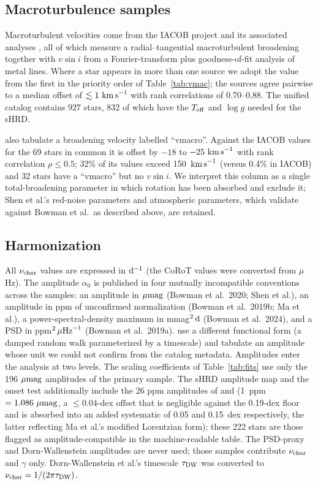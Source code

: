 \documentclass[twocolumn]{aastex631}
\newcommand{\vsini}{v\sin i}
\newcommand{\teff}{T_{\rm eff}}
\newcommand{\nuchar}{\nu_{\rm char}}
\newcommand{\umag}{\mu{\rm mag}}
\newcommand{\dinv}{{\rm d}^{-1}}
\newcommand{\kms}{{\rm km\,s}^{-1}}
\begin{document}
\subsection{Macroturbulence samples}\label{sec:vmac}

Macroturbulent velocities come from the IACOB project and its associated analyses \citep{simondiaz2014,simondiaz2017,holgado2018,deburgos2023,deburgos2024,burssens2020}, all of which measure a radial--tangential macroturbulent broadening together with $\vsini$ from a Fourier-transform plus goodness-of-fit analysis of metal lines. Where a star appears in more than one source we adopt the value from the first in the priority order of Table~\ref{tab:vmac}; the sources agree pairwise to a median offset of $\lesssim1~\kms$ with rank correlations of 0.70--0.88. The unified catalog contains 927 stars, 832 of which have the $\teff$ and $\log g$ needed for the sHRD.

\citet{shen2024} also tabulate a broadening velocity labelled ``vmacro''. Against the IACOB values for the 69 stars in common it is offset by $-18$ to $-25~\kms$ with rank correlation $\rho\le0.5$; 32\% of its values exceed 150~$\kms$ (versus 0.4\% in IACOB) and 32 stars have a ``vmacro'' but no $\vsini$. We interpret this column as a single total-broadening parameter in which rotation has been absorbed and exclude it; Shen et al.'s red-noise parameters and atmospheric parameters, which validate against Bowman et al.\ as described above, are retained.

\subsection{Harmonization}\label{sec:harmon}

All $\nuchar$ values are expressed in $\dinv$ (the CoRoT values were converted from $\mu$Hz). The amplitude $\alpha_0$ is published in four mutually incompatible conventions across the samples: an amplitude in $\umag$ (Bowman et al.\ 2020; Shen et al.), an amplitude in ppm of unconfirmed normalization (Bowman et al.\ 2019b; Ma et al.), a power-spectral-density maximum in mmag$^2\,{\rm d}$ (Bowman et al.\ 2024), and a PSD in ppm$^2\,\mu{\rm Hz}^{-1}$ (Bowman et al.\ 2019a). \citet{dornwallenstein2020} use a different functional form (a damped random walk parameterized by a timescale) and tabulate an amplitude whose unit we could not confirm from the catalog metadata. Amplitudes enter the analysis at two levels. The scaling coefficients of Table~\ref{tab:fits} use only the 196 $\umag$ amplitudes of the primary sample. The sHRD amplitude map and the onset test additionally include the 26 ppm amplitudes of \citet{bowman2019b} and \citet{ma2024} (1~ppm $=1.086~\umag$, a $\le0.04$-dex offset that is negligible against the 0.19-dex floor and is absorbed into an added systematic of 0.05 and 0.15~dex respectively, the latter reflecting Ma et al.'s modified Lorentzian form); these 222 stars are those flagged as amplitude-compatible in the machine-readable table. The PSD-proxy and Dorn-Wallenstein amplitudes are never used; those samples contribute $\nuchar$ and $\gamma$ only. Dorn-Wallenstein et al.'s timescale $\tau_{\rm DW}$ was converted to $\nuchar=1/(2\pi\tau_{\rm DW})$.
\end{document}
